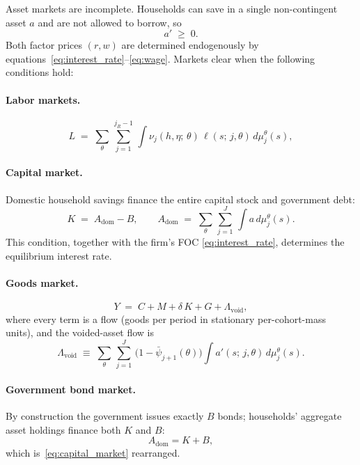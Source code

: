 \documentclass[12pt,a4paper]{article}
\begin{document}
\par Asset markets are incomplete. Households can save in a single non-contingent asset $a$ and are not allowed to borrow, so
\begin{equation}
\label{eq:borrowing_constraint}
a' \;\geq\; 0.
\end{equation}
Both factor prices $(r, w)$ are determined endogenously by equations~\eqref{eq:interest_rate}--\eqref{eq:wage}. Markets clear when the following conditions hold:

\paragraph{Labor markets.}
\begin{equation}
\label{eq:labor_market}
L \;=\; \sum_\theta\, \sum_{j=1}^{j_R - 1}\, \int \nu_j(h, \eta;\, \theta)\, \ell(s;\, j, \theta)\, d\mu_j^\theta(s),
\end{equation}
\paragraph{Capital market.}
Domestic household savings finance the entire capital stock and government debt:
\begin{equation}
\label{eq:capital_market}
K \;=\; A_{\mathrm{dom}} - B,
\qquad
A_{\mathrm{dom}} \;=\; \sum_\theta\, \sum_{j=1}^{J}\, \int a\, d\mu_j^\theta(s).
\end{equation}
This condition, together with the firm's FOC \eqref{eq:interest_rate}, determines the equilibrium interest rate.

\paragraph{Goods market.}
\begin{equation}
\label{eq:goods_market}
Y \;=\; C + M + \delta\, K + G + \Lambda_{\mathrm{void}},
\end{equation}
where every term is a flow (goods per period in stationary per-cohort-mass units), and the voided-asset flow is
\begin{equation}
\label{eq:leakage_voided}
\Lambda_{\mathrm{void}}
\;\equiv\;
\sum_\theta\, \sum_{j=1}^{J}\, \bigl(1 - \bar\psi_{j+1}(\theta)\bigr)
\int a'(s;\, j, \theta)\, d\mu_j^\theta(s).
\end{equation}
\paragraph{Government bond market.}
By construction the government issues exactly $B$ bonds; households' aggregate asset holdings finance both $K$ and $B$:
\begin{equation}
A_{\mathrm{dom}} = K + B,
\end{equation}
which is~\eqref{eq:capital_market} rearranged.
\end{document}
